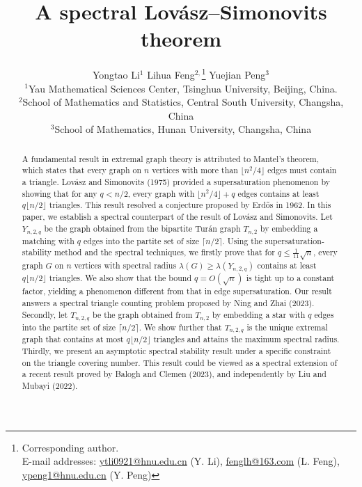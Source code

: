 \documentclass[11pt]{article}
\begin{document}
\title{A spectral  Lov\'{a}sz--Simonovits theorem}



\author{Yongtao Li$^{1}$\quad 
 Lihua Feng$^{2,}$\thanks{Corresponding author. \\
E-mail addresses:  
\url{ytli0921@hnu.edu.cn} (Y. Li), 
\url{fenglh@163.com} (L. Feng), 
\url{ypeng1@hnu.edu.cn} (Y. Peng)} 
\quad  
Yuejian Peng$^{3}$  \\
{\small $^{1}$Yau Mathematical Sciences Center, Tsinghua University, Beijing, China.} \\ 
{\small $^{2}$School of Mathematics and Statistics,  Central South University, Changsha, China} \\ 
 {\small $^{3}$School of Mathematics, Hunan University, Changsha, China }  
 }


 
\maketitle

\vspace{-0.5cm}



\begin{abstract}
A fundamental result in extremal graph theory is attributed to Mantel's theorem, which states that every graph on $n$ vertices with more than $\lfloor n^2/4 \rfloor$ edges must contain a triangle. 
 Lov\'{a}sz and Simonovits (1975) provided a supersaturation phenomenon by showing that for any $q< n/2$, every graph with $\lfloor n^2/4 \rfloor +q$ edges contains at least $q\lfloor n/2 \rfloor$ triangles.  This result resolved a conjecture proposed by Erd\H{o}s in 1962. 
In this paper, we establish a spectral counterpart of 
the result of Lov\'{a}sz and Simonovits. 
Let $Y_{n,2,q}$  be the graph obtained 
from the bipartite Tur\'{a}n graph $T_{n,2}$ by embedding 
a matching with $q$ edges into 
the partite set of size $\lceil n/2\rceil$.  
Using the supersaturation-stability method 
and the spectral techniques,  
we firstly prove that for $q\le \frac{1}{11}\sqrt{n}$, 
every graph $G$ on $n$ vertices with spectral radius $\lambda (G) \ge \lambda (Y_{n,2,q})$ contains at least $q\lfloor n/2 \rfloor$ triangles.  
We also show that the bound $q=O(\sqrt{n})$ is tight up to a constant factor,  yielding a phenomenon different from that in edge supersaturation.  
Our result answers a spectral triangle counting problem 
proposed by Ning and Zhai (2023).  
Secondly, let $T_{n,2,q}$  be the graph obtained 
from  $T_{n,2}$ by embedding a star with $q$ edges into 
the partite set of size $\lceil n/2\rceil$.  
We show further that $T_{n,2,q}$ is the unique extremal graph 
that contains at most $q\lfloor n/2 \rfloor$ triangles and 
attains the maximum spectral radius. 
Thirdly,  we present an asymptotic spectral stability result 
 under a specific constraint on the triangle covering number. 
This result could be viewed as 
a spectral extension of a recent result proved by Balogh and Clemen (2023), 
and independently by Liu and Mubayi (2022).  
 \end{abstract}
\end{document}
